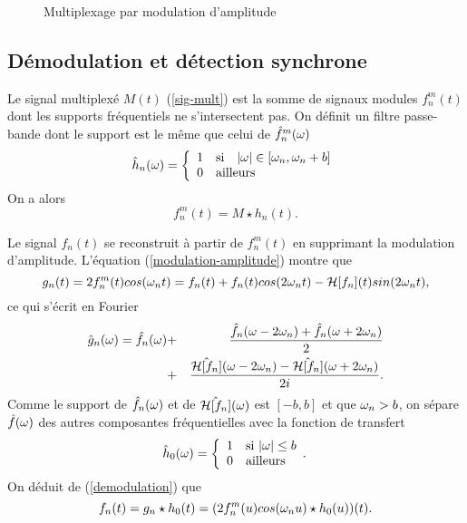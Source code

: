 
\begin{figure}[bhtp]
\vspace{13cm}
\caption{Multiplexage par modulation d'amplitude}
\label{Multi-fig}
\end{figure}

\subsection{D\'emodulation et d\'etection synchrone}

Le signal multiplex\'e $M(t)$ (\ref {sig-mult}) est la
somme de signaux modules $f^m_n(t)$ 
dont les supports fr\'equentiels
ne s'intersectent pas.
On d\'efinit un filtre passe-bande dont le support est
le m\^eme que celui de $\hat f_n^m ({\omega})$
\begin{equation} 
\hat h_n ( {\omega} ) = 
   \left \{ \begin{array}{ll} 
            1 & \mbox{si~~ $|{\omega}| \in  [ {\omega}_n ,  {\omega}_n + b ]$}\\
            0 & \mbox{ailleurs } 
            \end{array}
   \right.  
\end{equation}
On a alors 
\[
f_n^m (t) = M \star h_n (t) .
\]

Le signal $f_n(t)$ se reconstruit \`a partir de $f_n^m (t)$ 
en supprimant la modulation d'amplitude.
L'\'equation (\ref{modulation-amplitude}) montre que
\begin{equation} 
g_n (t) = 2 f_n^m (t) cos({\omega}_n t ) = f_n (t) + 
f_n (t) cos (2 {\omega}_n t) - 
{\cal H} [f_n] (t) sin (2 {\omega}_n t) ,
\end{equation} 
ce qui s'\'ecrit en Fourier
\begin{eqnarray}
\label{demodulation}
\hat g_n ({\omega})
= \hat f_n ({\omega})& + &
\frac {\hat f_n ({\omega}-2{\omega}_n) + \hat f_n ({\omega}+2{\omega}_n)} 2 \\
&+ &
\frac {\hat {{\cal H}[f_n]}({\omega}-2{\omega}_n) - 
\hat {{\cal H}[f_n]}({\omega}+2{\omega}_n)} {2i}. \nonumber 
\end{eqnarray}
Comme le support de $\hat f_n ({\omega})$ et 
de $\hat {{\cal H}[f_n]}({\omega} )$ est $[-b,b]$ et que
${\omega}_n > b$, on s\'epare $\hat f({\omega})$ des autres composantes
fr\'equentielles avec la fonction de transfert
\begin{equation} 
\hat h_0 ( {\omega} ) = 
   \left \{ \begin{array}{ll} 
            1 &\mbox{si $|{\omega} | \leq b$}\\
            0 & \mbox{ailleurs}
            \end{array} .
   \right.  
\end{equation}
On d\'eduit de (\ref{demodulation}) que
\[
f_n (t) = g_n \star h_0  (t) = (2 f_n^m (u) cos({\omega}_n u ) 
\star h_0 (u))(t) .
\]
